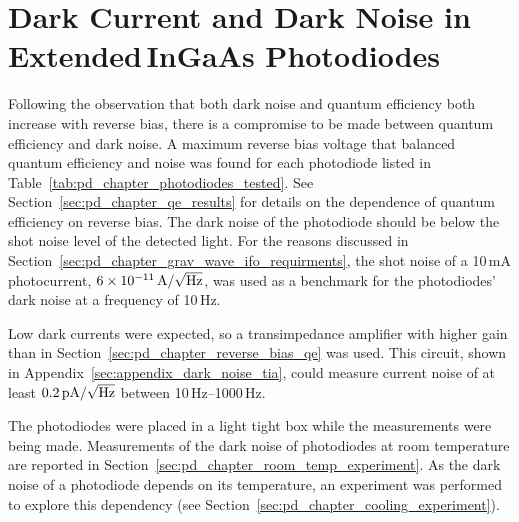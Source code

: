 \section{Dark Current and Dark Noise in Extended\,InGaAs Photodiodes}
\label{sec:photodiode_chapter_dark_noise}
Following the observation that both dark noise and quantum efficiency both increase with reverse bias, there is a compromise to be made between quantum efficiency and dark noise. A maximum reverse bias voltage that balanced quantum efficiency and noise was found for each photodiode listed in Table~\ref{tab:pd_chapter_photodiodes_tested}. See Section~\ref{sec:pd_chapter_qe_results} for details on the dependence of quantum efficiency on reverse bias. The dark noise of the photodiode should be below the shot noise level of the detected light. For the reasons discussed in Section~\ref{sec:pd_chapter_grav_wave_ifo_requirments}, the shot noise of a 10\,mA photocurrent, $6\times10^{-11}\,\si{\ampere/\sqrt{\hertz}}$, was used as a benchmark for the photodiodes' dark noise at a frequency of 10\,Hz. 
\par
Low dark currents were expected, so a transimpedance amplifier with higher gain than in Section~\ref{sec:pd_chapter_reverse_bias_qe} was used. This circuit, shown in Appendix~\ref{sec:appendix_dark_noise_tia}, could measure current noise of at least $0.2\,\si{\pico\ampere/\sqrt{\hertz}}$ between 10\,Hz--1000\,Hz.
\par
The photodiodes were placed in a light tight box while the measurements were being made. Measurements of the dark noise of photodiodes at room temperature are reported in Section~\ref{sec:pd_chapter_room_temp_experiment}. As the dark noise of a photodiode depends on its temperature, an experiment was performed to explore this dependency (see Section~\ref{sec:pd_chapter_cooling_experiment}).
